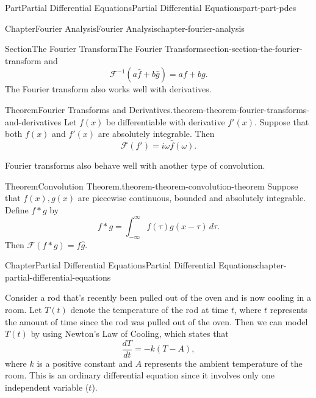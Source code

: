\documentclass[twoside,10pt,]{book}
\numberwithin{equation}{part}
\begin{document}
\begin{partptx}{Part}{Partial Differential Equations}{}{Partial Differential Equations}{}{}{part-part-pdes}
\begin{chapterptx}{Chapter}{Fourier Analysis}{}{Fourier Analysis}{}{}{chapter-fourier-analysis}
\begin{sectionptx}{Section}{The Fourier Transform}{}{The Fourier Transform}{}{}{section-section-the-fourier-transform}
and%
\begin{equation*}
\mathcal{F}^{-1}(a\hat{f}+b\hat{g}) = af + bg.
\end{equation*}
The Fourier transform also works well with derivatives.%
\begin{theorem}{Theorem}{Fourier Transforms and Derivatives.}{}{theorem-theorem-fourier-transforms-and-derivatives}%
%
Let \(f(x)\) be differentiable with derivative \(f'(x)\). Suppose that both \(f(x)\) and \(f'(x)\) are absolutely integrable. Then%
\begin{equation*}
\mathcal{F}(f') = i\omega\hat{f}(\omega).
\end{equation*}
%
\end{theorem}
Fourier transforms also behave well with another type of convolution.%
\begin{theorem}{Theorem}{Convolution Theorem.}{}{theorem-theorem-convolution-theorem}%
%
Suppose that \(f(x),g(x)\) are piecewise continuous, bounded and absolutely integrable. Define \(f\ast g\) by%
\begin{equation*}
f\ast g = \int_{-\infty}^{\infty}f(\tau)g(x-\tau)\,d\tau.
\end{equation*}
Then \(\mathcal{F}(f\ast g) = \hat{f}\hat{g}.\)%
\end{theorem}
\end{sectionptx}
\end{chapterptx}
%
\typeout{************************************************}
\typeout{************************************************}
%
\begin{chapterptx}{Chapter}{Partial Differential Equations}{}{Partial Differential Equations}{}{}{chapter-partial-differential-equations}
\renewcommand*{\chaptername}{Chapter}
\begin{introduction}{}%
Consider a rod that's recently been pulled out of the oven and is now cooling in a room. Let \(T(t)\) denote the temperature of the rod at time \(t\), where \(t\) represents the amount of time since the rod was pulled out of the oven. Then we can model \(T(t)\) by using Newton's Law of Cooling, which states that%
\begin{equation*}
\frac{dT}{dt} = -k(T-A),
\end{equation*}
where \(k\) is a positive constant and \(A\) represents the ambient temperature of the room. This is an ordinary differential equation since it involves only one independent variable (\(t\)).%

\end{introduction}
\end{chapterptx}
\end{partptx}
\end{document}
